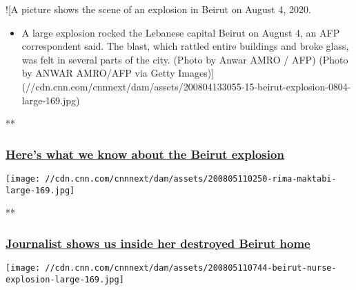 \href{/videos/world/2020/08/04/beirut-explosion-video-mss-orig.cnn/video/playlists/beirut-explosion/}{}

!{[}A picture shows the scene of an explosion in Beirut on August 4,
2020.

\begin{itemize}
\tightlist
\item
  A large explosion rocked the Lebanese capital Beirut on August 4, an
  AFP correspondent said. The blast, which rattled entire buildings and
  broke glass, was felt in several parts of the city. (Photo by Anwar
  AMRO / AFP) (Photo by ANWAR AMRO/AFP via Getty
  Images){]}(//cdn.cnn.com/cnnnext/dam/assets/200804133055-15-beirut-explosion-0804-large-169.jpg)
\end{itemize}

**

\hypertarget{heres-what-we-know-about-the-beirut-explosion}{%
\subsubsection{\texorpdfstring{\href{/videos/world/2020/08/04/beirut-explosion-video-mss-orig.cnn/video/playlists/beirut-explosion/}{Here's
what we know about the Beirut
explosion}}{Here's what we know about the Beirut explosion}}\label{heres-what-we-know-about-the-beirut-explosion}}

\href{/videos/world/2020/08/05/rima-maktabi-journalist-home-destroyed-beirut-explosion-ctw-vpx.cnn/video/playlists/beirut-explosion/}{}

\texttt{[image: //cdn.cnn.com/cnnnext/dam/assets/200805110250-rima-maktabi-large-169.jpg]}

**

\hypertarget{journalist-shows-us-inside-her-destroyed-beirut-home}{%
\subsubsection{\texorpdfstring{\href{/videos/world/2020/08/05/rima-maktabi-journalist-home-destroyed-beirut-explosion-ctw-vpx.cnn/video/playlists/beirut-explosion/}{Journalist
shows us inside her destroyed Beirut
home}}{Journalist shows us inside her destroyed Beirut home}}\label{journalist-shows-us-inside-her-destroyed-beirut-home}}

\href{/videos/world/2020/08/05/lebanon-beirut-explosion-blast-nurse-three-babies-picture-ctw-intl-ldn-vpx.cnn/video/playlists/beirut-explosion/}{}

\texttt{[image: //cdn.cnn.com/cnnnext/dam/assets/200805110744-beirut-nurse-explosion-large-169.jpg]}

